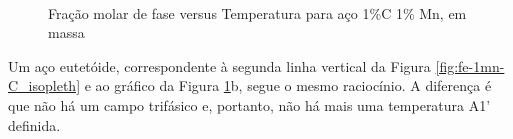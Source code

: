 \documentclass[brazil,tf,epusp]{usp}  %
\begin{document}
\begin{figure}[ht!]
  \hfill
  \\
  \caption{Fração molar de fase versus Temperatura para aço 1\%C 1\% Mn, em massa}
  \label{fig:fe-1mn-c}
\end{figure}


Um aço eutetóide, correspondente à segunda linha vertical da Figura \ref{fig:fe-1mn-C_isopleth} e ao gráfico da Figura \ref{fig:fe-1mn-c}b, segue o mesmo raciocínio. A diferença é que não há um campo trifásico e, portanto, não há mais uma temperatura A1' definida.
\end{document}
